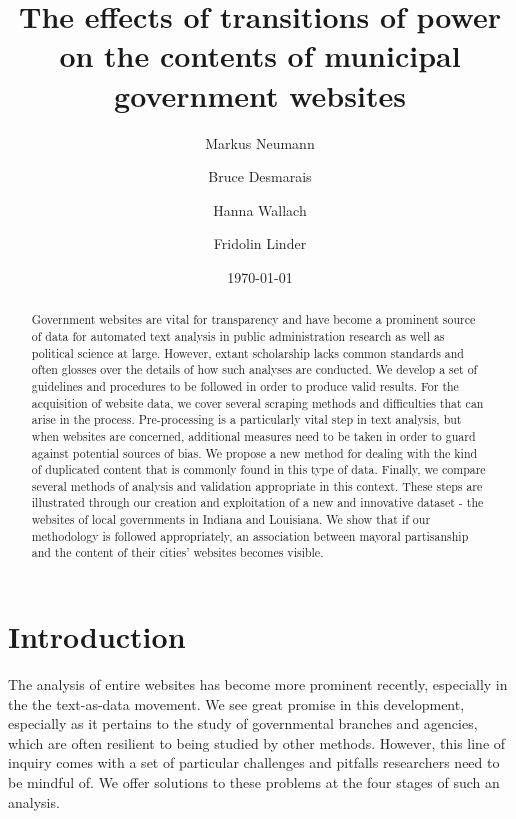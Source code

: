 \documentclass[11pt]{article}
\title{\vspace{-2cm} The effects of transitions of power on the contents of municipal government websites }
\author{ Markus Neumann \and Bruce Desmarais \and Hanna Wallach \and Fridolin Linder} \date{\today}
\begin{document}
\maketitle




\begin{abstract}

Government websites are vital for transparency and have become a prominent source of data for automated text analysis in public administration research as well as political science at large. However, extant scholarship lacks common standards and often glosses over the details of how such analyses are conducted. We develop a set of guidelines and procedures to be followed in order to produce valid results. For the acquisition of website data, we cover several scraping methods and difficulties that can arise in the process. Pre-processing is a particularly vital step in text analysis, but when websites are concerned, additional measures need to be taken in order to guard against potential sources of bias. We propose a new method for dealing with the kind of duplicated content that is commonly found in this type of data. Finally, we compare several methods of analysis and validation appropriate in this context. These steps are illustrated through our creation and exploitation of a new and innovative dataset - the websites of local governments in Indiana and Louisiana. We show that if our methodology is followed appropriately, an association between mayoral partisanship and the content of their cities' websites becomes visible.

\end{abstract}
\thispagestyle{empty}
\section{Introduction}

The analysis of entire websites has become more prominent recently, especially in the the text-as-data movement. We see great promise in this development, especially as it pertains to the study of governmental branches and agencies, which are often resilient to being studied by other methods. However, this line of inquiry comes with a set of particular challenges and pitfalls researchers need to be mindful of. We offer solutions to these problems at the four stages of such an analysis.
\end{document}
